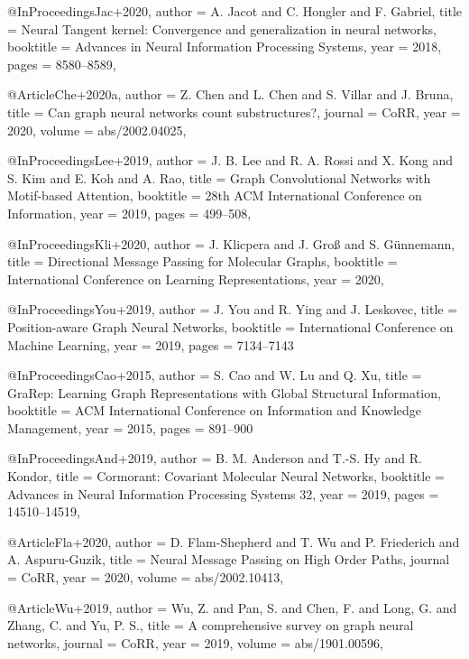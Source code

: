 @InProceedings{Jac+2020,
  author    = {A. Jacot and C. Hongler and F. Gabriel},
  title     = {{Neural Tangent kernel:} Convergence and generalization in neural networks},
  booktitle = {Advances in Neural Information Processing Systems},
  year      = {2018},
  pages     = {8580--8589},
}

@Article{Che+2020a,
  author  = {Z. Chen and L. Chen and S. Villar and J. Bruna},
  title   = {Can graph neural networks count substructures?},
  journal = {CoRR},
  year    = {2020},
  volume  = {abs/2002.04025},
}

@InProceedings{Lee+2019,
  author    = {J. B. Lee and R. A. Rossi and X. Kong and S. Kim and E. Koh and A. Rao},
  title     = {Graph Convolutional Networks with Motif-based Attention},
  booktitle = {28th {ACM} International Conference on Information},
  year      = {2019},
  pages     = {499--508},
}

@InProceedings{Kli+2020,
  author    = {J. Klicpera and J. Gro{\ss} and S. G{\"{u}}nnemann},
  title     = {Directional Message Passing for Molecular Graphs},
  booktitle = {International Conference on Learning Representations},
  year      = {2020},
}

@InProceedings{You+2019,
  author    = {J. You and R. Ying and J. Leskovec},
  title     = {Position-aware Graph Neural Networks},
  booktitle = {International Conference on Machine Learning},
  year      = {2019},
  pages     = {7134--7143}
}

@InProceedings{Cao+2015,
  author    = {S. Cao and W. Lu and Q. Xu},
  title     = {{GraRep:} {L}earning Graph Representations with Global Structural Information},
  booktitle = {{ACM} International Conference on Information and Knowledge Management},
  year      = {2015},
  pages     = {891--900}
}

@InProceedings{And+2019,
  author    = {B. M. Anderson and T.{-}S. Hy and R. Kondor},
  title     = {Cormorant: Covariant Molecular Neural Networks},
  booktitle = {Advances in Neural Information Processing Systems 32},
  year      = {2019},
  pages     = {14510--14519},
}

@Article{Fla+2020,
  author  = {D. Flam{-}Shepherd and T. Wu and P. Friederich and A. Aspuru{-}Guzik},
  title   = {Neural Message Passing on High Order Paths},
  journal = {CoRR},
  year    = {2020},
  volume  = {abs/2002.10413},
}

@Article{Wu+2019,
  author  = {Wu, Z. and Pan, S. and Chen, F. and Long, G. and Zhang, C. and Yu, P. S.},
  title   = {A comprehensive survey on graph neural networks},
  journal = {CoRR},
  year    = {2019},
  volume  = {abs/1901.00596},
}

